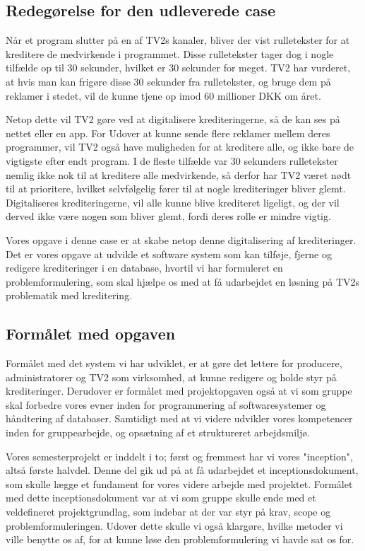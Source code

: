 \subsection{Redegørelse for den udleverede case}
Når et program slutter på en af TV2s kanaler, bliver der vist rulletekster for at kreditere de medvirkende i programmet. Disse rulletekster tager dog i nogle tilfælde op til 30 sekunder, hvilket er 30 sekunder for meget. TV2 har vurderet, at hvis man kan frigøre disse 30 sekunder fra rulletekster, og bruge dem på reklamer i stedet, vil de kunne tjene op imod 60 millioner DKK om året. \cite{url_case}

Netop dette vil TV2 gøre ved at digitalisere krediteringerne, så de kan ses på nettet eller en app. For Udover at kunne sende flere reklamer mellem deres programmer, vil TV2 også have muligheden for at kreditere alle, og ikke bare de vigtigste efter endt program. I de fleste tilfælde var 30 sekunders rulletekster nemlig ikke nok til at kreditere alle medvirkende, så derfor har TV2 været nødt til at prioritere, hvilket selvfølgelig fører til at nogle krediteringer bliver glemt. Digitaliseres krediteringerne, vil alle kunne blive krediteret ligeligt, og der vil derved ikke være nogen som bliver glemt, fordi deres rolle er mindre vigtig.

Vores opgave i denne case er at skabe netop denne digitalisering af krediteringer. Det er vores opgave at udvikle et software system som kan tilføje, fjerne og redigere krediteringer i en database, hvortil vi har formuleret en problemformulering, som skal hjælpe os med at få udarbejdet en løsning på TV2s problematik med kreditering.

\subsection{Formålet med opgaven}
Formålet med det system vi har udviklet, er at gøre det lettere for producere, administratorer og TV2 som virksomhed, at kunne redigere og holde styr på krediteringer. Derudover er formålet med projektopgaven også at vi som gruppe skal forbedre vores evner inden for programmering af softwaresystemer og håndtering af databaser. Samtidigt med at vi videre udvikler vores kompetencer inden for gruppearbejde, og opsætning af et struktureret arbejdsmiljø.

Vores semesterprojekt er inddelt i to; først og fremmest har vi vores "inception", altså første halvdel. Denne del gik ud på at få udarbejdet et inceptionsdokument, som skulle lægge et fundament for vores videre arbejde med projektet. Formålet med dette inceptionsdokument var at vi som gruppe skulle ende med et veldefineret projektgrundlag, som indebar at der var styr på krav, scope og problemformuleringen. Udover dette skulle vi også klargøre, hvilke metoder vi ville benytte os af, for at kunne løse den problemformulering vi havde sat os for.


